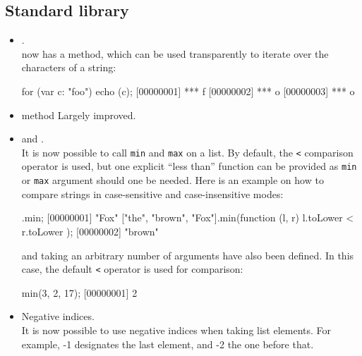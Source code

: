 \subsection{Standard library}
\begin{itemize}
\item {}.\\
   now has a  method, which can be used
  transparently to iterate over the characters of a string:

\begin{urbiscript}
for (var c: "foo") echo (c);
[00000001] *** f
[00000002] *** o
[00000003] *** o
\end{urbiscript}

\item {} method Largely improved.

\item {} and .\\
  It is now possible to call \lstinline{min} and \lstinline{max} on a
  list. By default, the \lstinline|<| comparison operator is used, but one
  explicit ``less than'' function can be provided as \lstinline{min} or
  \lstinline{max} argument should one be needed. Here is an example on how
  to compare strings in case-sensitive and case-insensitive modes:

\begin{urbiscript}
.min;
[00000001] "Fox"
["the", "brown", "Fox"].min(function (l, r) { l.toLower < r.toLower });
[00000002] "brown"
\end{urbiscript}

   and  taking an arbitrary number of
  arguments have also been defined. In this case, the default \lstinline{<}
  operator is used for comparison:

\begin{urbiscript}
min(3, 2, 17);
[00000001] 2
\end{urbiscript}

\item Negative indices.\\
  It is now possible to use negative indices when taking list elements.  For
  example, -1 designates the last element, and -2 the one before that.


\end{itemize}
